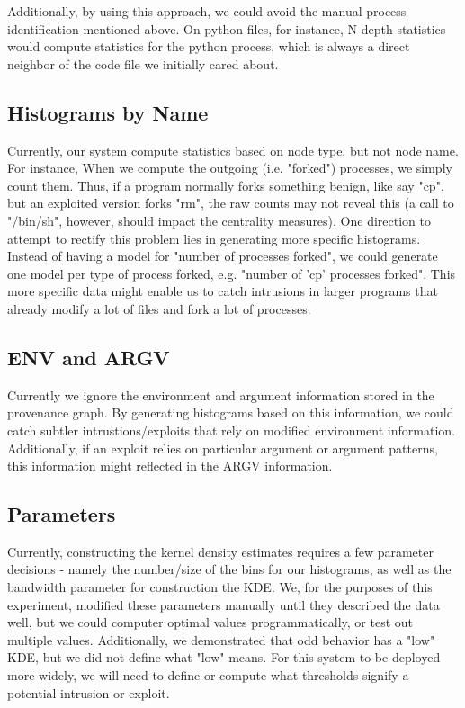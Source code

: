 \documentclass[10pt,twocolumn]{article}
\begin{document}
Additionally, by using this approach, we could avoid the manual process identification mentioned above. On python files, for instance, N-depth statistics would compute statistics for the python process, which is always a direct neighbor of the code file we initially cared about.
\subsection{Histograms by Name}
Currently, our system compute statistics based on node type, but not node name. For instance, When we compute the outgoing (i.e. "forked") processes, we simply count them. Thus, if a program normally forks something benign, like say "cp", but an exploited version forks "rm", the raw counts may not reveal this (a call to "/bin/sh", however, should impact the centrality measures). One direction to attempt to rectify this problem lies in generating more specific histograms. Instead of having a model for "number of processes forked", we could generate one model per type of process forked, e.g. "number of 'cp' processes forked". This more specific data might enable us to catch intrusions in larger programs that already modify a lot of files and fork a lot of processes.
\subsection{ENV and ARGV}
Currently we ignore the environment and argument information stored in the provenance graph. By generating histograms based on this information, we could catch subtler intrustions/exploits that rely on modified environment information. Additionally, if an exploit relies on particular argument or argument patterns, this information might reflected in the ARGV information.
\subsection{Parameters}
Currently, constructing the kernel density estimates requires a few parameter decisions - namely the number/size of the bins for our histograms, as well as the bandwidth parameter for construction the KDE. We, for the purposes of this experiment, modified these parameters manually until they described the data well, but we could computer optimal values programmatically, or test out multiple values. Additionally, we demonstrated that odd behavior has a "low" KDE, but we did not define what "low" means. For this system to be deployed more widely, we will need to define or compute what thresholds signify a potential intrusion or exploit.
\end{document}
